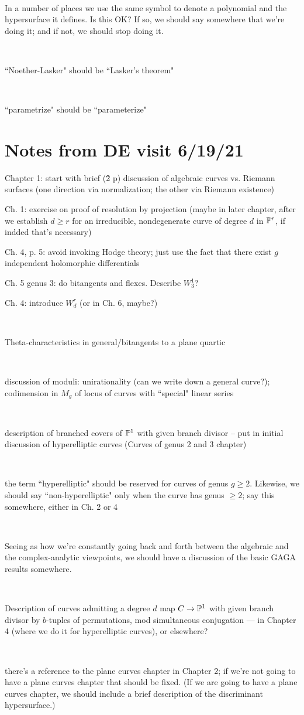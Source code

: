 \documentclass[12pt, leqno]{book}
\begin{document}
\

In a number of places we use the same symbol to denote a polynomial and the hypersurface it defines. Is this OK? If so, we should say somewhere that we're doing it; and if not, we should stop doing it.

\

``Noether-Lasker" should be ``Lasker's theorem"

\

``parametrize" should be ``parameterize"

\section{Notes from DE visit 6/19/21}

Chapter 1: start with brief (\~2 p) discussion of algebraic curves vs. Riemann surfaces (one direction via normalization; the other via Riemann existence)

Ch. 1: exercise on proof of resolution by projection (maybe in later chapter, after we establish $d \geq r$ for an irreducible, nondegenerate  curve of degree $d$ in $\PP^r$, if indded that's necessary)

Ch. 4, p. 5: avoid invoking Hodge theory; just use the fact that there exist $g$ independent holomorphic differentials


Ch. 5 genus 3: do bitangents and flexes. Describe $W^1_3$?

Ch. 4: introduce $W^r_d$ (or in Ch. 6, maybe?)

\

Theta-characteristics in general/bitangents to a plane quartic

\

discussion of moduli: unirationality (can we write down a general curve?); codimension in $M_g$ of locus of curves with ``special" linear series

\

description of branched covers of $\PP^1$ with given branch divisor -- put in initial discussion of hyperelliptic curves (Curves of genus 2 and 3 chapter)

\

the term ``hyperelliptic" should be reserved for curves of genus $g \geq 2$. Likewise, we should say ``non-hyperelliptic" only when the curve has genus $\geq 2$; say this somewhere, either in Ch. 2 or 4

\

Seeing as how we're constantly going back and forth between the algebraic and the complex-analytic viewpoints,  we should have a discussion of the basic GAGA results somewhere.

\

Description of curves admitting a degree $d$ map $C \to \PP^1$ with given branch divisor by $b$-tuples of permutations, mod simultaneous conjugation --- in Chapter 4 (where we do it for hyperelliptic curves), or elsewhere?

\

there's a reference to the plane curves chapter in Chapter 2; if we're not going to have a plane curves chapter that should be fixed. (If we are going to have a plane curves chapter, we should include a brief description of the discriminant hypersurface.)
\end{document}
